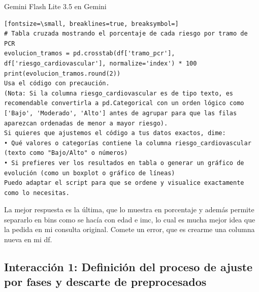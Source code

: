 \documentclass[12pt,a4paper,oneside]{book}
\begin{document}
\begin{iaresp}{Gemini Flash Lite 3.5 en Gemini}
\begin{Verbatim}[fontsize=\small, breaklines=true, breaksymbol=]
# Tabla cruzada mostrando el porcentaje de cada riesgo por tramo de PCR
evolucion_tramos = pd.crosstab(df['tramo_pcr'], df['riesgo_cardiovascular'], normalize='index') * 100
print(evolucion_tramos.round(2))
Usa el código con precaución.
(Nota: Si la columna riesgo_cardiovascular es de tipo texto, es recomendable convertirla a pd.Categorical con un orden lógico como ['Bajo', 'Moderado', 'Alto'] antes de agrupar para que las filas aparezcan ordenadas de menor a mayor riesgo).
Si quieres que ajustemos el código a tus datos exactos, dime:
• Qué valores o categorías contiene la columna riesgo_cardiovascular (texto como "Bajo/Alto" o números)
• Si prefieres ver los resultados en tabla o generar un gráfico de evolución (como un boxplot o gráfico de líneas)
Puedo adaptar el script para que se ordene y visualice exactamente como lo necesitas.

\end{Verbatim}
\end{iaresp}
\begin{iaanalisis}
La mejor respuesta es la última, que lo muestra en porcentaje y además permite separarlo en bins como se hacía con edad e imc, lo cual es mucha mejor idea que la pedida en mi consulta original. Comete un error, que es crearme una columna nueva en mi df.
\end{iaanalisis}

\subsection*{Interacción 1: Definición del proceso de ajuste por fases y descarte de preprocesados}
\end{document}
